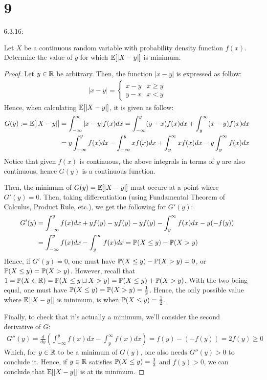 \documentclass{article}
\begin{document}
\newpage
\section*{9}
\begin{ques}\label{q9}
    6.3.16:

    Let $X$ be a continuous random variable with probability density function $f(x)$. Determine the value of $y$ for which $\mathbb{E}[|X-y|]$ is minimum.
\end{ques}

\begin{proof}
    Let $y\in\mathbb{R}$ be arbitrary. Then, the function $|x-y|$ is expressed as follow:
    \begin{align}
        |x-y|=\begin{cases}
            x-y & x\geq y\\
            y-x & x<y
        \end{cases}
    \end{align}
    Hence, when calculating $\mathbb{E}[|X-y|]$, it is given as follow:
    \begin{align}
        G(y):=\mathbb{E}[|X-y|] &= \int_{-\infty}^{\infty}|x-y|f(x)dx = \int_{-\infty}^{y}(y-x)f(x)dx + \int_{y}^{\infty}(x-y)f(x)dx\\
        &= y \int_{-\infty}^{y}f(x)dx  - \int_{-\infty}^{y}xf(x)dx + \int_{y}^{\infty}xf(x)dx - y\int_{y}^{\infty}f(x)dx
    \end{align}
    Notice that given $f(x)$ is continuous, the above integrals in terms of $y$ are also continuous, hence $G(y)$ is a continuous function.

    Then, the minimum of $G(y)=\mathbb{E}[|X-y|]$ must occure at a point where $G'(y)=0$. Then, taking differentiation (using Fundamental Theorem of Calculus, Product Rule, etc.), we get the following for $G'(y)$:
    \begin{align}
        G'(y) &= \int_{-\infty}^{y}f(x)dx + yf(y) - yf(y) - yf(y) - \int_{y}^{\infty}f(x)dx - y(-f(y))\\
        &= \int_{-\infty}^{y}f(x)dx - \int_{y}^{\infty}f(x)dx = \mathbb{P}(X\leq y) - \mathbb{P}(X>y)
    \end{align}
    Hence, if $G'(y)=0$, one must have $\mathbb{P}(X\leq y)-\mathbb{P}(X>y)=0$, or $\mathbb{P}(X\leq y)=\mathbb{P}(X>y)$. However, recall that $1=\mathbb{P}(X\in \mathbb{R})=\mathbb{P}({X\leq y}\sqcup {X>y}) = \mathbb{P}(X\leq y)+\mathbb{P}(X>y)$. With the two being equal, one must have $\mathbb{P}(X\leq y)=\mathbb{P}(X>y)=\frac{1}{2}$. Hence, the only possible value where $\mathbb{E}[|X-y|]$ is minimum, is when $\mathbb{P}(X\leq y)=\frac{1}{2}$.


    \hfil

    Finally, to check that it's actually a minimum, we'll consider the second derivative of $G$:
    \begin{align}
        G''(y) = \frac{d}{dy}\left(\int_{-\infty}^{y}f(x)dx - \int_{y}^{\infty}f(x)dx \right) = f(y) - (-f(y)) = 2f(y)\geq 0
    \end{align}
    Which, for $y\in\mathbb{R}$ to be a minimum of $G(y)$, one also needs $G''(y)>0$ to conclude it. Hence, if $y\in\mathbb{R}$ satisfies $\mathbb{P}(X\leq y)=\frac{1}{2}$ and $f(y)>0$, we can conclude that $\mathbb{E}[|X-y|]$ is at its minimum.
\end{proof}
\end{document}
